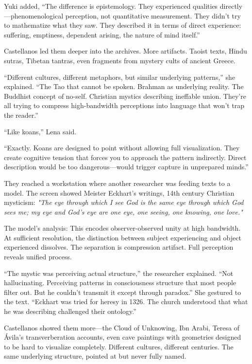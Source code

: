 Yuki added, ``The difference is epistemology. They experienced qualities directly—phenomenological perception, not quantitative measurement. They didn't try to mathematize what they saw. They described it in terms of direct experience: suffering, emptiness, dependent arising, the nature of mind itself.''

Castellanos led them deeper into the archives. More artifacts. Taoist texts, Hindu sutras, Tibetan tantras, even fragments from mystery cults of ancient Greece.

``Different cultures, different metaphors, but similar underlying patterns,'' she explained. ``The Tao that cannot be spoken. Brahman as underlying reality. The Buddhist concept of no-self. Christian mystics describing ineffable union. They're all trying to compress high-bandwidth perceptions into language that won't trap the reader.''

``Like koans,'' Lena said.

``Exactly. Koans are designed to point without allowing full visualization. They create cognitive tension that forces you to approach the pattern indirectly. Direct description would be too dangerous—would trigger capture in unprepared minds.''

They reached a workstation where another researcher was feeding texts to a model. The screen showed Meister Eckhart's writings, 14th century Christian mysticism: \textit{"The eye through which I see God is the same eye through which God sees me; my eye and God's eye are one eye, one seeing, one knowing, one love."}

The model's analysis: This encodes observer-observed unity at high bandwidth. At sufficient resolution, the distinction between subject experiencing and object experienced dissolves. The separation is compression artifact. Full perception reveals unified process.

``The mystic was perceiving actual structure,'' the researcher explained. ``Not hallucinating. Perceiving patterns in consciousness structure that most people filter out. But he couldn't transmit it except through paradox.'' She gestured to the text. ``Eckhart was tried for heresy in 1326. The church understood that what he was describing challenged their ontology.''

Castellanos showed them more---the Cloud of Unknowing, Ibn Arabi, Teresa of Ávila's transverberation accounts, even cave paintings with geometries designed to be hard to visualize completely. Different cultures, different centuries. The same underlying structure, pointed at but never fully named.


